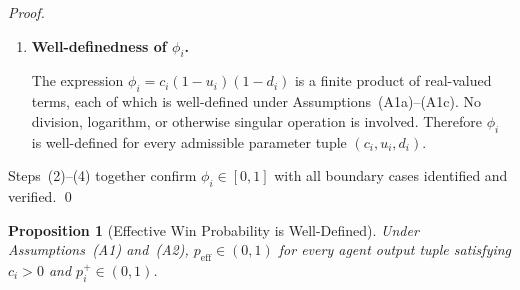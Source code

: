\documentclass[12pt,openany]{book}
\numberwithin{equation}{chapter}
\theoremstyle{plain}
\newtheorem{proposition}[theorem]{Proposition}
\theoremstyle{definition}
\theoremstyle{remark}
\numberwithin{equation}{chapter}
\theoremstyle{plain}
\begin{document}
\begin{proof}
\begin{enumerate}
  \item[\textup{(5)}] \textbf{Well-definedness of $\phi_i$.}

        The expression $\phi_i = c_i(1-u_i)(1-d_i)$ is a
        finite product of real-valued terms, each of which
        is well-defined under
        Assumptions~\textup{(A1a)}--\textup{(A1c)}.
        No division, logarithm, or otherwise singular
        operation is involved.  Therefore $\phi_i$ is
        well-defined for every admissible parameter tuple
        $(c_i, u_i, d_i)$.

\end{enumerate}
\noindent
Steps~(2)--(4) together confirm
$\phi_i \in [0,1]$ with all boundary cases identified
and verified.
\qed
\end{proof}

\begin{proposition}[Effective Win Probability is Well-Defined]
\label{prop:eff-win-prob-valid}
Under Assumptions~\textup{(A1)} and~\textup{(A2)},
$p_{\mathrm{eff}} \in (0,1)$ for every agent output tuple
satisfying $c_i > 0$ and $p_i^+ \in (0,1)$.
\end{proposition}
\end{document}
